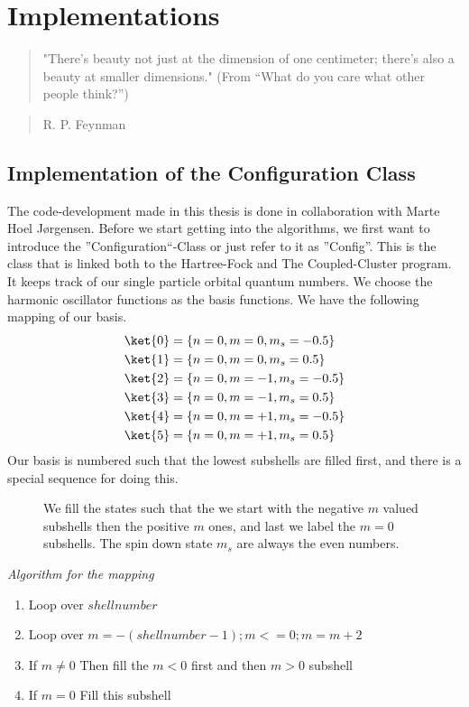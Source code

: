 \chapter{Implementations}
\begin{quote}
  "There's beauty not just at the dimension of one centimeter; there's also a beauty at smaller dimensions."  (From ``What do you care what other people think?'')
\end{quote}

\begin{quote}
  R. P. Feynman
\end{quote}



\section{Implementation of the Configuration Class}
\label{config}
The code-development made in this thesis is done in collaboration with Marte Hoel J\o rgensen. Before we start getting into the algorithms, we first want to introduce the ''Configuration``-Class or just refer to it as ''Config''. This is the class that is linked both to the Hartree-Fock and The Coupled-Cluster program. It keeps track of our single particle orbital quantum numbers. We choose the harmonic oscillator functions as the basis functions. We have the following mapping of our basis. 
\begin{align*}
  \ket{0} & = \{n=0, m=0, m_s = -0.5\} \\ 
  \ket{1} & = \{n=0, m=0, m_s = 0.5\} \\
  \ket{2} & = \{n=0, m=-1, m_s = -0.5\} \\
  \ket{3} & = \{n=0, m=-1, m_s = 0.5\} \\
  \ket{4} & = \{n=0, m=+1, m_s = -0.5\} \\
  \ket{5} & = \{n=0, m=+1, m_s = 0.5\}   
\end{align*}
%
Our basis is numbered such that the lowest subshells are filled first, and there is a special sequence for doing this. 
%
\begin{figure}[ht]
\centering
\scalebox{0.7}{}
\caption{We fill the states such that the we start with the negative $m$ valued subshells then the positive $m$ ones, and last we label the $m=0$ subshells. The spin down state $m_s$ are always the even numbers.}
\end{figure}
% 
\begin{algorithm}[ht]
\caption{\emph{Algorithm for the mapping}}
\begin{enumerate}
\item Loop over $shellnumber$
\item Loop over $m=-(shellnumber-1);m<=0; m = m+2$
\item If $m \neq 0$ Then fill the $m<0$ first and then $m>0$ subshell
\item If $m = 0$ Fill this subshell
\end{enumerate}
\end{algorithm}
